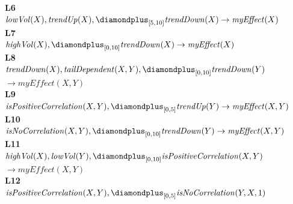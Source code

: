 \begin{figure}[t]
{\begin{minipage}{0.95\textwidth}
\textbf{L6}\\
\hspace*{1.5em}\mbox{$\mathit{lowVol}(X), \mathit{trendUp}(X), \diamondplus_{[5,10]} \mathit{trendDown}(X) \to \mathit{myEffect}(X)$}\\[4pt]
\textbf{L7}\\
\hspace*{1.5em}\mbox{$\mathit{highVol}(X), \diamondplus_{[0,10]} \mathit{trendDown}(X) \to \mathit{myEffect}(X)$}\\[4pt]
\textbf{L8}\\
\hspace*{1.5em}\mbox{$\mathit{trendDown}(X), \mathit{tailDependent}(X,Y), \diamondplus_{[0,10]} \mathit{trendDown}(Y)$}\\
\hspace*{1.5em}\hspace*{3em}\mbox{$\to \mathit{myEffect}(X,Y)$}\\[4pt]
\textbf{L9}\\
\hspace*{1.5em}\mbox{$\mathit{isPositiveCorrelation}(X,Y), \diamondplus_{[0,5]} \mathit{trendUp}(Y) \to \mathit{myEffect}(X,Y)$}\\[4pt]
\textbf{L10}\\
\hspace*{1.5em}\mbox{$\mathit{isNoCorrelation}(X,Y), \diamondplus_{[0,10]} \mathit{trendDown}(Y) \to \mathit{myEffect}(X,Y)$}\\[4pt]
\textbf{L11}\\
\hspace*{1.5em}\mbox{$\mathit{highVol}(X), \mathit{lowVol}(Y), \diamondplus_{[0,10]} \mathit{isPositiveCorrelation}(X,Y)$}\\
\hspace*{1.5em}\hspace*{3em}\mbox{$\to \mathit{myEffect}(X,Y)$}\\[4pt]
\textbf{L12}\\
\hspace*{1.5em}\mbox{$\mathit{isPositiveCorrelation}(X,Y), \diamondplus_{[0,5]} \mathit{isNoCorrelation}(Y,X,1)$}\\

\end{minipage}}
\end{figure}
